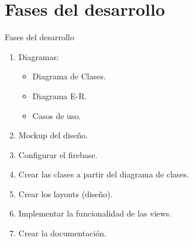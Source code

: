 \documentclass[12pt]{beamer}
\begin{document}
\section{Fases del desarrollo}
\begin{frame}{Fases del desarrollo}

\begin{enumerate}
\item Diagramas:

\begin{itemize}
\item Diagrama de Clases.
\item Diagrama E-R.
\item Casos de uso.
\end{itemize}

\item Mockup del diseño.

\item Configurar el firebase.

\item Crear las clases a partir del diagrama de clases.

\item Crear los layouts (diseño).

\item Implementar la funcionalidad de las views.

\item Crear la documentación.

\end{enumerate}
\end{frame}
\end{document}
